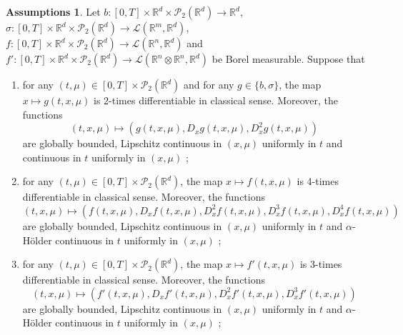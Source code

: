 \documentclass[10pt, a4paper]{article} %
\newcommand{\R}{\mathbb{R}}
\theoremstyle{definition}
\newtheorem{assumptions}[defn]{Assumptions}
\theoremstyle{plain}
\begin{document}
\begin{assumptions} \label{assumptions_uniqueness}
    Let $b:[0,T] \times \R^d \times \mathcal{P}_2(\R^d) \to \R^d$, $\sigma: [0,T] \times \R^d \times \mathcal{P}_2(\R^d) \to \mathscr{L}(\R^m,\R^d)$, $f:[0,T] \times \R^d \times \mathcal{P}_2(\R^d) \to \mathscr{L}(\R^n,\R^d)$ and $f':[0,T] \times \R^d \times \mathcal{P}_2(\R^d) \to \mathscr{L}(\R^n \otimes \R^n ,\R^d)$ be Borel measurable. Suppose that
    \begin{enumerate} \renewcommand{\labelenumi}{(\alph{enumi})}

        \item for any $(t,\mu) \in [0, T] \times \mathcal{P}_2 (\mathbb{R}^d)$ and for any $g \in \{b,\sigma\}$, the map $x \mapsto g (t, x, \mu)$ is 2-times differentiable in classical sense. Moreover, the functions \[ (t, x, \mu) \mapsto (g (t, x, \mu), D_x g (t, x, \mu), D^2_x g (t, x, \mu)) \] are globally bounded, Lipschitz continuous in $(x, \mu)$ uniformly in $t$ and continuous in $t$ uniformly in $(x, \mu)$ ;

    
        \item for any $(t,\mu) \in [0, T] \times \mathcal{P}_2 (\mathbb{R}^d)$, the map $x \mapsto f (t, x, \mu)$ is 4-times differentiable in classical sense. Moreover, the functions \[ (t, x, \mu) \mapsto (f (t, x, \mu), D_x f (t, x, \mu), D^2_x f (t, x, \mu), D^3_x f (t, x, \mu), D^4_x f (t, x, \mu)) \] are globally bounded, Lipschitz continuous in $(x, \mu)$ uniformly in $t$ and $\alpha$-H\"older continuous in $t$ uniformly in $(x, \mu)$ ;
  
        \item for any $(t,\mu) \in [0, T] \times \mathcal{P}_2 (\mathbb{R}^d)$, the map $x \mapsto f' (t, x, \mu)$ is 3-times differentiable in classical sense. Moreover, the functions \[ (t, x, \mu) \mapsto (f' (t, x, \mu), D_x f' (t, x, \mu), D^2_x f' (t, x, \mu), D^3_x f' (t, x, \mu)) \] are globally bounded, Lipschitz continuous in $(x, \mu)$ uniformly in $t$ and $\alpha$-H\"older continuous in $t$ uniformly in $(x, \mu)$ ;
     

\end{enumerate}
\end{assumptions}
\end{document}

